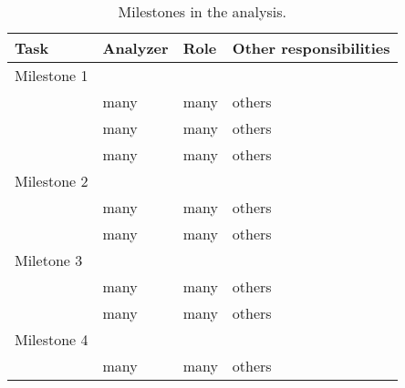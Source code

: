 \begin{table}[htb]
\caption{Milestones in the analysis.}
\begin{tabular}{llll}\hline
Task & Analyzer & Role & Other responsibilities\\\hline
Milestone 1\\
\color{red}{Generation dijet invariant mass pseudo-distributions} & many & many & others\\
\color{red}{Perform S+B fitting of pseudo-data}                   & many & many & others\\
\color{green}{Unblinding}                                         &
many & many & others\\
\hline
Milestone 2\\
\color{red}{Perform S+B fitting of data}                          & many & many & others\\
\color{green}{Decision to claim discover or set limits}           & many & many & others\\
\hline
Miletone 3\\
\color{red}{Set model-independent limits}                         & many & many & others\\
\color{red}{Set model-dependent limits}                           & many & many & others\\
\hline
Milestone 4\\
\color{green}{Write paper}                                        & many & many & others\\
\hline
\end{tabular}
\end{table}
